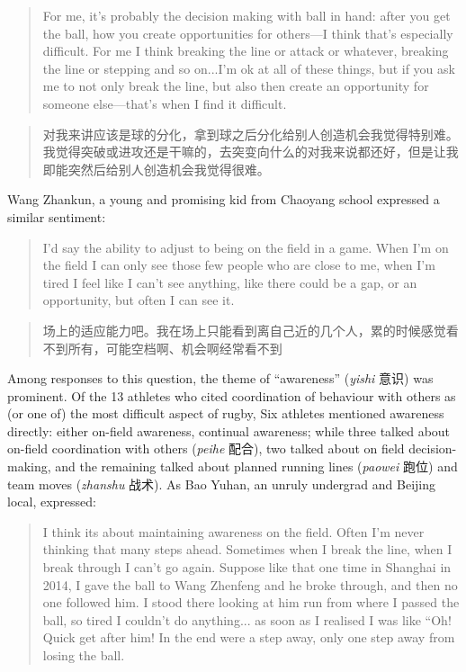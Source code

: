 \begin{CJK}{UTF8}{gbsn}
\begin{quotation}
  For me, it's probably the decision making with ball in hand: after you get the ball, how you create opportunities for others---I think that's especially difficult.  For me I think breaking the line or attack or whatever, breaking the line or stepping and so on...I'm ok at all of these things, but if you ask me to not only break the line, but also then create an opportunity for someone else---that's when I find it difficult.
\end{quotation}

\begin{quotation}
  对我来讲应该是球的分化，拿到球之后分化给别人创造机会我觉得特别难。我觉得突破或进攻还是干嘛的，去突变向什么的对我来说都还好，但是让我即能突然后给别人创造机会我觉得很难。
\end{quotation}

Wang Zhankun, a young and promising kid from Chaoyang school expressed a similar sentiment:

\begin{quotation}
  I’d say the ability to adjust to being on the field in a game.  When I’m on the field I can only see those few people who are close to me, when I’m tired I feel like I can’t see anything, like there could be a gap, or an opportunity, but often I can see it.
\end{quotation}

\begin{quotation}
  场上的适应能力吧。我在场上只能看到离自己近的几个人，累的时候感觉看不到所有，可能空档啊、机会啊经常看不到
\end{quotation}

Among responses to this question, the theme of ``awareness'' (\textit{yishi} 意识) was prominent. Of the 13 athletes who cited coordination of behaviour with others as (or one of) the most difficult aspect of rugby,  Six athletes mentioned awareness directly: either on-field awareness, continual awareness; while three talked about on-field coordination with others (\textit{peihe} 配合), two talked about on field decision-making, and the remaining talked about planned running lines (\textit{paowei} 跑位) and team moves (\textit{zhanshu} 战术). As Bao Yuhan, an unruly undergrad and Beijing local, expressed:

\begin{quotation}
  I think its about maintaining awareness on the field. Often I'm never thinking that many steps ahead.  Sometimes when I break the line, when I break through I can't go again. Suppose like that one time in Shanghai in 2014, I gave the ball to Wang Zhenfeng and he broke through, and then no one followed him.  I stood there looking at him run from where I passed the ball, so tired I couldn't do anything... as soon as I realised I was like ``Oh! Quick get after him! In the end were a step away, only one step away from losing the ball.
\end{quotation}



\end{CJK}
